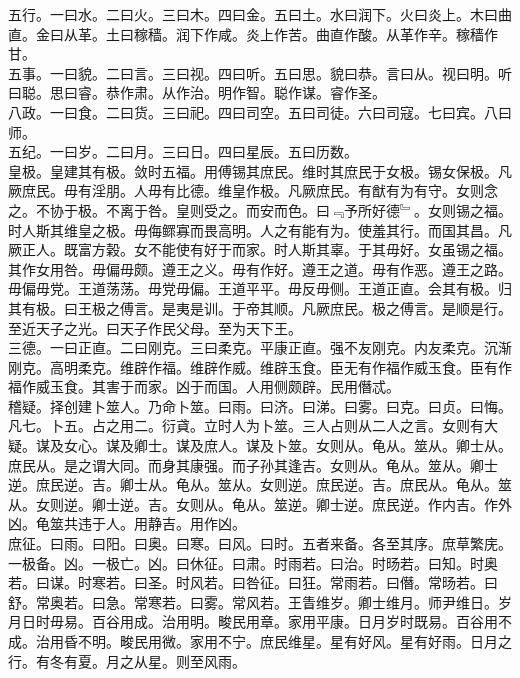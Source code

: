 \documentclass{zhvt-classic}
\begin{document}
\hspace*{2em}五行。一曰水。二曰火。三曰木。四曰金。五曰土。水曰润下。火曰炎上。木曰曲直。金曰从革。土曰稼穑。润下作咸。炎上作苦。曲直作酸。从革作辛。稼穑作甘。\\
\hspace*{2em}五事。一曰貌。二曰言。三曰视。四曰听。五曰思。貌曰恭。言曰从。视曰明。听曰聪。思曰睿。恭作肃。从作治。明作智。聪作谋。睿作圣。\\
\hspace*{2em}八政。一曰食。二曰货。三曰祀。四曰司空。五曰司徒。六曰司寇。七曰宾。八曰师。\\
\hspace*{2em}五纪。一曰岁。二曰月。三曰日。四曰星辰。五曰历数。\\
\hspace*{2em}皇极。皇建其有极。敛时五福。用傅锡其庶民。维时其庶民于女极。锡女保极。凡厥庶民。毋有淫朋。人毋有比德。维皇作极。凡厥庶民。有猷有为有守。女则念之。不协于极。不离于咎。皇则受之。而安而色。曰﹃予所好德﹄。女则锡之福。时人斯其维皇之极。毋侮鳏寡而畏高明。人之有能有为。使羞其行。而国其昌。凡厥正人。既富方榖。女不能使有好于而家。时人斯其辜。于其毋好。女虽锡之福。其作女用咎。毋偏毋颇。遵王之义。毋有作好。遵王之道。毋有作恶。遵王之路。毋偏毋党。王道荡荡。毋党毋偏。王道平平。毋反毋侧。王道正直。会其有极。归其有极。曰王极之傅言。是夷是训。于帝其顺。凡厥庶民。极之傅言。是顺是行。至近天子之光。曰天子作民父母。至为天下王。\\
\hspace*{2em}三德。一曰正直。二曰刚克。三曰柔克。平康正直。强不友刚克。内友柔克。沉渐刚克。高明柔克。维辟作福。维辟作威。维辟玉食。臣无有作福作威玉食。臣有作福作威玉食。其害于而家。凶于而国。人用侧颇辟。民用僭忒。\\
\hspace*{2em}稽疑。择创建卜筮人。乃命卜筮。曰雨。曰济。曰涕。曰雾。曰克。曰贞。曰悔。凡七。卜五。占之用二。衍貣。立时人为卜筮。三人占则从二人之言。女则有大疑。谋及女心。谋及卿士。谋及庶人。谋及卜筮。女则从。龟从。筮从。卿士从。庶民从。是之谓大同。而身其康强。而子孙其逢吉。女则从。龟从。筮从。卿士逆。庶民逆。吉。卿士从。龟从。筮从。女则逆。庶民逆。吉。庶民从。龟从。筮从。女则逆。卿士逆。吉。女则从。龟从。筮逆。卿士逆。庶民逆。作内吉。作外凶。龟筮共违于人。用静吉。用作凶。\\
\hspace*{2em}庶征。曰雨。曰阳。曰奥。曰寒。曰风。曰时。五者来备。各至其序。庶草繁庑。一极备。凶。一极亡。凶。曰休征。曰肃。时雨若。曰治。时旸若。曰知。时奥若。曰谋。时寒若。曰圣。时风若。曰咎征。曰狂。常雨若。曰僭。常旸若。曰舒。常奥若。曰急。常寒若。曰雾。常风若。王眚维岁。卿士维月。师尹维日。岁月日时毋易。百谷用成。治用明。畯民用章。家用平康。日月岁时既易。百谷用不成。治用昏不明。畯民用微。家用不宁。庶民维星。星有好风。星有好雨。日月之行。有冬有夏。月之从星。则至风雨。\\
\end{document}
